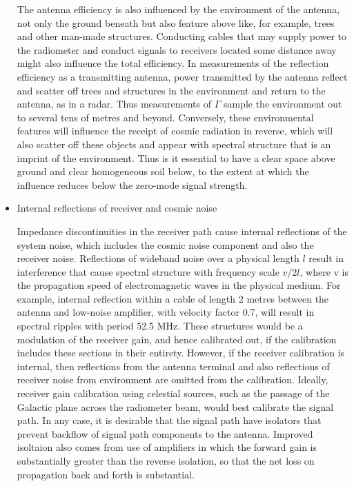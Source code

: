 \begin{itemize}
   The antenna efficiency is also influenced by the environment of the antenna, not only the ground beneath but also feature above like, for example, trees and other man-made structures.  Conducting cables that may supply power to the radiometer and conduct signals to receivers located some distance away might also influence the total efficiency.  In measurements of the reflection efficiency as a transmitting antenna, power transmitted by the antenna reflect and scatter off trees and structures in the environment and return to the antenna, as in a radar. Thus measurements of $\Gamma$ sample the environment out to several tens of metres and beyond.  Conversely, these environmental features will influence the receipt of cosmic radiation in reverse, which will also scatter off these objects and appear with spectral structure that is an imprint of the environment.  Thus is it essential to have a clear space above ground and clear homogeneous soil below, to the extent at which the influence reduces below the zero-mode signal strength.
   
  \item
  Internal reflections of receiver and cosmic noise
  
  Impedance discontinuities in the receiver path cause internal reflections of the system noise, which includes the cosmic noise component and also the receiver noise.  Reflections of wideband noise over a physical length $l$ result in interference that cause spectral structure with frequency scale $v/2l$, where v is the propagation speed of electromagnetic waves in the physical medium.  For example, internal reflection within a cable of length 2 metres between the antenna and low-noise amplifier, with velocity factor 0.7, will result in spectral ripples with period 52.5 MHz. These structures would be a modulation of the receiver gain, and hence calibrated out, if the calibration includes these sections in their entirety.  However, if the receiver calibration is internal, then reflections from the antenna terminal and also reflections of receiver noise from environment are omitted from the calibration.  Ideally, receiver gain calibration using celestial sources, such as the passage of the Galactic plane across the radiometer beam, would best calibrate the signal path.  In any case, it is desirable that the signal path have isolators that prevent backflow of signal path components to the antenna.  Improved isoltaion also comes from use of amplifiers in which the forward gain is substantially greater than the reverse isolation, so that the net loss on propagation back and forth is substantial.
  

\end{itemize}
